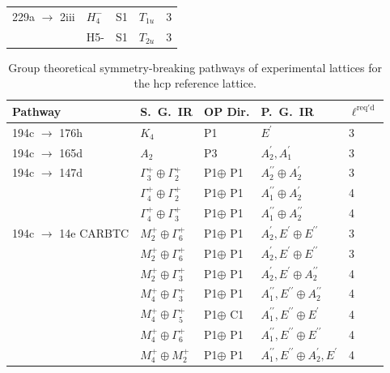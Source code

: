 \documentclass[preprint]{revtex4}
\begin{document}
\begin{table}[!ht]
\begin{tabular}{lllll}
229a $\rightarrow$ 2iii & $H_4^-$ & S1 & $T_{1u}$ & 3\\
& H5- & S1 & $T_{2u}$ & 3\\
\hline
\end{tabular}
\end{table}

\pagebreak

\begin{table}[!ht]
\caption{Group theoretical symmetry-breaking pathways of
experimental lattices for the hcp reference
lattice.}\label{pathwaysHCP}\tiny
\begin{tabular}{lllll}\hline
Pathway & S.~G.~IR & OP Dir. & P.~G.~IR & $\ell^{\mathrm{req'd}}$ \\
\hline
194c $\rightarrow$ 176h & $K_4$ & P1 & $E^\prime$ & 3 \\
194c $\rightarrow$ 165d & $A_2$ & P3 & $A_2^\prime,A_1^\prime$ & 3 \\
194c $\rightarrow$ 147d & $\Gamma_3^+ \oplus \Gamma_2^+$ & P1$ \oplus$ P1 & $A_2^{\prime\prime}\oplus A_2^\prime$ & 3 \\
& $\Gamma_4^+ \oplus \Gamma_2^+$ & P1$ \oplus$ P1 & $A_1^{\prime\prime}\oplus A_2^\prime$ & 4 \\
& $\Gamma_4^+ \oplus \Gamma_3^+$ & P1$ \oplus$ P1 & $A_1^{\prime\prime}\oplus A_2^{\prime\prime}$ & 4 \\
194c  $\rightarrow$ 14e CARBTC & $M_2^+ \oplus \Gamma_6^+$ & P1$ \oplus$ P1 &  $A_2^\prime,E^\prime \oplus E^{\prime\prime}$ & 3 \\
& $M_2^+ \oplus \Gamma_6^+$ & P1$ \oplus$ P1  &  $A_2^\prime,E^\prime \oplus E^{\prime\prime}$ & 3 \\
& $M_2^+ \oplus \Gamma_3^+$ & P1$ \oplus$ P1 &  $A_2^\prime,E^\prime \oplus A_2^{\prime\prime}$ & 4 \\
& $M_4^+ \oplus \Gamma_3^+$ & P1$ \oplus$ P1 &   $A_1^{\prime\prime},E^{\prime\prime} \oplus A_2^{\prime\prime}$ & 4 \\
& $M_4^+ \oplus \Gamma_5^+$ & P1$ \oplus$ C1 &  $A_1^{\prime\prime},E^{\prime\prime} \oplus E^\prime$ & 4 \\
& $M_4^+ \oplus \Gamma_6^+$ & P1$ \oplus$ P1 &  $A_1^{\prime\prime},E^{\prime\prime} \oplus E^{\prime\prime}$ & 4 \\
& $M_4^+ \oplus M_2^+$  & P1$ \oplus$ P1 & $A_1^{\prime\prime},E^{\prime\prime} \oplus A_2^\prime,E^\prime$ & 4 \\
\hline
\end{tabular}
\end{table}
\end{document}
